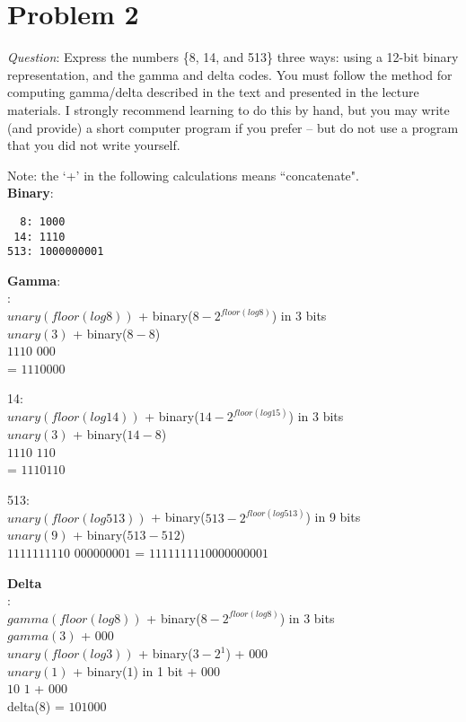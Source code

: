 \documentclass{article}
\begin{document}
\section{Problem 2}
\noindent \textit{Question}: Express the numbers \{8, 14, and 513\} three ways: using a 12-bit binary representation, and the gamma and
delta codes. You must follow the method for computing gamma/delta described in the text and presented in the lecture
materials. I strongly recommend learning to do this by hand, but you may write (and provide) a short computer
program if you prefer – but do not use a program that you did not write yourself.
\newline

\noindent Note: the `+' in the following calculations means ``concatenate". \\
\noindent \textbf{Binary}: 
\begin{verbatim}
  8: 1000
 14: 1110
513: 1000000001
\end{verbatim}

\noindent \textbf{Gamma}: \\
: \\
$unary(floor(log 8))$ + binary($8-2^{floor(log 8)}$) in 3 bits \\
$unary(3)$ + binary($8-8$) \\
$1110$ $000$ \\
= $1110000$
\newline


14: \\
$unary(floor(log 14))$ + binary($14-2^{floor(log 15)}$) in 3 bits \\
$unary(3)$ + binary($14-8$) \\
$1110$ $110$ \\
= $1110110$ \\
\newline

513: \\
$unary(floor(log 513))$ + binary($513-2^{floor(log 513)}$) in 9 bits \\
$unary(9)$ + binary($513-512$) \\
$1111111110$  $000000001$
= $1111111110000000001$
\newline

\noindent \textbf{Delta} \\
: \\
$gamma(floor(log 8))$ + binary($8-2^{floor(log 8)}$) in 3 bits \\
$gamma(3)$ + $000$ \\
$unary(floor(log 3))$ + binary($3-2^1$) + $000$ \\
$unary(1)$ + binary($1$) in 1 bit + $000$ \\
$10$ $1$ + $000$ \\
delta(8) = $101000$ \\
\newline
\end{document}
